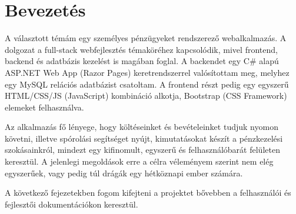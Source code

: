 \chapter{Bevezetés}
\label{ch:intro}

A választott témám egy személyes pénzügyeket rendszerező webalkalmazás. A dolgozat a full-stack webfejlesztés témaköréhez kapcsolódik, mivel frontend, backend és adatbázis kezelést is magában foglal. A backendet egy C\# alapú ASP.NET Web App (Razor Pages) keretrendszerrel valósítottam meg, melyhez egy MySQL relációs adatbázist csatoltam. A frontend részt pedig egy egyszerű HTML/CSS/JS (JavaScript) kombináció alkotja, Bootstrap (CSS Framework) elemeket felhasználva.

Az alkalmazás fő lényege, hogy költéseinket és bevételeinket tudjuk nyomon követni, illetve spórolási segítséget nyújt, kimutatásokat készít a pénzkezelési szokásainkról, mindezt egy kifinomult, egyszerű és felhasználóbarát felületen keresztül. A jelenlegi megoldások erre a célra véleményem szerint nem elég egyszerűek, vagy pedig túl drágák egy hétköznapi ember számára.

A következő fejezetekben fogom kifejteni a projektet bővebben a felhasználói és fejlesztői dokumentációkon keresztül.
